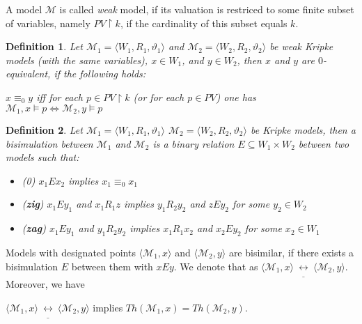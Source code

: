 \documentclass[a4paper]{article}
\theoremstyle{defin}
\newtheorem{defin}{Definition}
\theoremstyle{theorem}
\theoremstyle{prop}
\theoremstyle{lemma}
\theoremstyle{fact}
\theoremstyle{exercise}
\theoremstyle{ex}
\theoremstyle{col}
\theoremstyle{claim}
\begin{document}
A model $\mathcal{M}$ is called \emph{weak} model, if its valuation is restriced to some finite subset of variables, namely $PV \upharpoonright k$, if the cardinality of this subset equals $k$.

\begin{defin}
Let $\mathcal{M}_1 = \langle W_1, R_1, \vartheta_1 \rangle$ and $\mathcal{M}_2 = \langle W_2, R_2, \vartheta_2 \rangle$ be weak Kripke models (with the same variables), $x \in W_1$, and $y \in W_2$, then $x$ and $y$ are $0$-equivalent, if the following holds:

\begin{center}
  $x \equiv_0 y$ iff for each $p \in PV \upharpoonright k$ (or for each $p \in PV$) one has $\mathcal{M}_1, x \models p \Leftrightarrow \mathcal{M}_2, y \models p$
\end{center}
\end{defin}

\begin{defin}
  Let $\mathcal{M}_1 = \langle W_1, R_1, \vartheta_1 \rangle$ $\mathcal{M}_2 = \langle W_2, R_2, \vartheta_2 \rangle$ be Kripke models, then a bisimulation between $\mathcal{M}_1$ and $\mathcal{M}_2$ is a binary relation $E \subseteq W_1 \times W_2$ between two models such that:
  \begin{itemize}
    \item (0) $x_1 E x_2$ implies $x_1 \equiv_0 x_1$
    \item ({\bf zig}) $x_1 E y_1$ and $x_1 R_1 z$ implies $y_1 R_2 y_2$ and $z E y_2$ for some $y_2 \in W_2$
    \item ({\bf zag}) $x_1 E y_1$ and $y_1 R_2 y_2$ implies $x_1 R_1 x_2$ and $x_2 E y_2$ for some $x_2 \in W_1$
  \end{itemize}
\end{defin}

Models with designated points $\langle \mathcal{M}_1, x \rangle$ and  $\langle \mathcal{M}_2, y \rangle$ are bisimilar, if there exists a bisimulation $E$ between them with $x E y$. We denote that as $\langle \mathcal{M}_1, x \rangle \: \underline{\leftrightarrow} \: \langle \mathcal{M}_2, y \rangle$. Moreover, we have
\begin{center}
  $\langle \mathcal{M}_1, x \rangle \: \underline{\leftrightarrow} \: \langle \mathcal{M}_2, y \rangle$ implies $Th(\mathcal{M}_1, x) = Th(\mathcal{M}_2, y)$.
\end{center}
\end{document}
